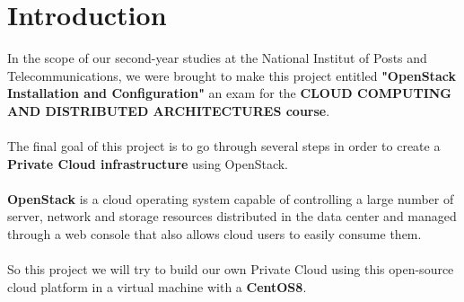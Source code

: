 \chapter*{Introduction}
\begin{spacing}{1.5}
\Large In the scope of our second-year studies at the National Institut of Posts and Telecommunications, we were brought to make this project entitled \textbf{"OpenStack Installation and Configuration"} an exam for the \textbf{CLOUD COMPUTING AND DISTRIBUTED ARCHITECTURES course}.
\\\\
The final goal of this project is to go through several steps in order to create a \textbf{Private Cloud infrastructure} using OpenStack.
\\\\
\textbf{OpenStack} is a cloud operating system capable of controlling a large number of server, network and storage resources distributed in the data center and managed through a web console that also allows cloud users to easily consume them. 
\\\\
So this project we will try to build our own Private Cloud using this open-source cloud platform in a virtual machine with a \textbf{CentOS8}. \\ 


\end{spacing}

\makeatletter
\renewcommand{\thesection}{\@arabic\c@section}
\makeatother
